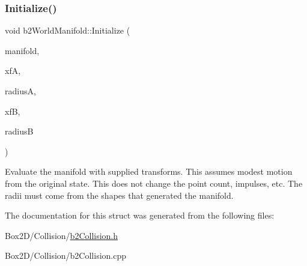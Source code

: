 \subsubsection{\texorpdfstring{Initialize()}{Initialize()}}
{\footnotesize\ttfamily void b2\+World\+Manifold\+::\+Initialize (\begin{DoxyParamCaption}\item[{const \hyperlink{structb2_manifold}{b2\+Manifold} $\ast$}]{manifold,  }\item[{const \hyperlink{structb2_transform}{b2\+Transform} \&}]{xfA,  }\item[{float32}]{radiusA,  }\item[{const \hyperlink{structb2_transform}{b2\+Transform} \&}]{xfB,  }\item[{float32}]{radiusB }\end{DoxyParamCaption})}

Evaluate the manifold with supplied transforms. This assumes modest motion from the original state. This does not change the point count, impulses, etc. The radii must come from the shapes that generated the manifold. 

The documentation for this struct was generated from the following files\+:\begin{DoxyCompactItemize}
\item 
Box2\+D/\+Collision/\hyperlink{b2_collision_8h}{b2\+Collision.\+h}\item 
Box2\+D/\+Collision/b2\+Collision.\+cpp\end{DoxyCompactItemize}
